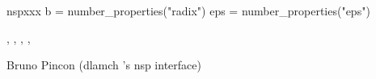 
\begin{examples}

\begin{mintednsp}{nspxxx}
b = number_properties("radix")
eps = number_properties("eps")
\end{mintednsp}

\end{examples}

\begin{manseealso}
, , , ,   %
\end{manseealso}

\begin{authors}
Bruno Pincon (dlamch 's nsp interface) 
\end{authors}

